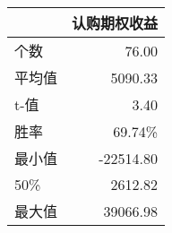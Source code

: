 \begin{tabular}{lr}
\toprule
{} &    认购期权收益 \\
\midrule
个数 &     76.00 \\
平均值  &   5090.33 \\
t-值   & 3.40 \\
胜率 & 69.74\%\\
最小值   & -22514.80 \\
50\%   &   2612.82 \\ 
最大值   &  39066.98 \\
\bottomrule
\end{tabular}
